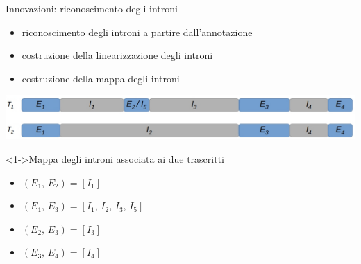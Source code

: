 \documentclass{beamer}
\begin{document}
\begin{tframe}{Innovazioni: riconoscimento degli introni}
  \begin{itemize}
    \item riconoscimento degli introni a partire dall'annotazione
    \item costruzione della linearizzazione degli introni
    \item costruzione della mappa degli introni
  \end{itemize}
  \begin{center}
     \includegraphics[scale = 0.39]{img/intron.jpg}
   \end{center}
  \begin{block}<1->{Mappa degli introni associata ai due trascritti}
    \begin{itemize}
      \item $(E_1,\,E_2) = [I_1]$
      \item $(E_1,\,E_3) = [I_1,\,I_2,\,I_3,\,I_5]$
      \item $(E_2,\,E_3) = [I_3]$
      \item $(E_3,\,E_4) = [I_4]$
    \end{itemize}
  \end{block}
\end{tframe}
\end{document}
